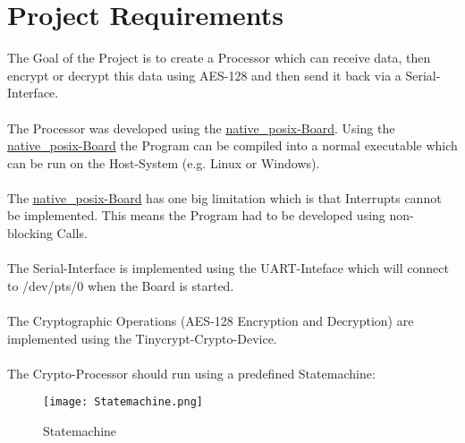 %
%
%
%
%


\section{Project Requirements}

The Goal of the Project is to create a Processor which can receive data, then
encrypt or decrypt this data using AES-128 and then send it back via a
Serial-Interface.
\\
\\
The Processor was developed using the
\href{https://docs.zephyrproject.org/2.0.0/boards/posix/native_posix/doc/index.html?highlight=native_posix}
{native\_posix-Board}.
Using the
\href{https://docs.zephyrproject.org/2.0.0/boards/posix/native_posix/doc/index.html?highlight=native_posix}
{native\_posix-Board} the Program can be compiled into a normal
executable which can be run on the Host-System (e.g. Linux or Windows).
\\
\\
The
\href{https://docs.zephyrproject.org/2.0.0/boards/posix/native_posix/doc/index.html?highlight=native_posix}
{native\_posix-Board} has one big limitation which is that Interrupts cannot be
implemented. This means the Program had to be developed using non-blocking Calls.
\\
\\
The Serial-Interface is implemented using the UART-Inteface which will connect to
/dev/pts/0 when the Board is started.
\\
\\
The Cryptographic Operations (AES-128 Encryption and Decryption) are implemented
using the Tinycrypt-Crypto-Device.
\\
\\
The Crypto-Processor should run using a predefined Statemachine:

\begin{figure}[!ht]
	\begin{center}
		\texttt{[image: Statemachine.png]}
		\caption{Statemachine}
	\end{center}
\end{figure}

